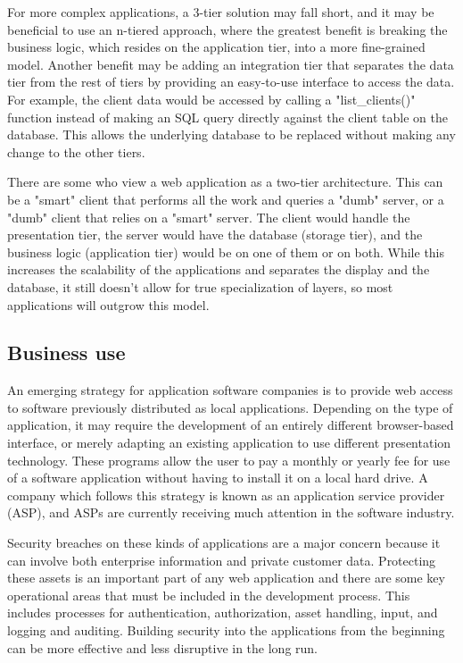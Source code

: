 For more complex applications, a 3-tier solution may fall short, and it may be beneficial to use an n-tiered approach, where the greatest benefit is breaking the business logic, which resides on the application tier, into a more fine-grained model.\cite{MakeNtierArchitecture} Another benefit may be adding an integration tier that separates the data tier from the rest of tiers by providing an easy-to-use interface to access the data. For example, the client data would be accessed by calling a "list\_clients()" function instead of making an SQL query directly against the client table on the database. This allows the underlying database to be replaced without making any change to the other tiers.

There are some who view a web application as a two-tier architecture. This can be a "smart" client that performs all the work and queries a "dumb" server, or a "dumb" client that relies on a "smart" server. The client would handle the presentation tier, the server would have the database (storage tier), and the business logic (application tier) would be on one of them or on both.\cite{MakeNtierArchitecture} While this increases the scalability of the applications and separates the display and the database, it still doesn't allow for true specialization of layers, so most applications will outgrow this model.

\subsection{Business use}

An emerging strategy for application software companies is to provide web access to software previously distributed as local applications. Depending on the type of application, it may require the development of an entirely different browser-based interface, or merely adapting an existing application to use different presentation technology. These programs allow the user to pay a monthly or yearly fee for use of a software application without having to install it on a local hard drive. A company which follows this strategy is known as an application service provider (ASP), and ASPs are currently receiving much attention in the software industry.

Security breaches on these kinds of applications are a major concern because it can involve both enterprise information and private customer data. Protecting these assets is an important part of any web application and there are some key operational areas that must be included in the development process. This includes processes for authentication, authorization, asset handling, input, and logging and auditing. Building security into the applications from the beginning can be more effective and less disruptive in the long run.

